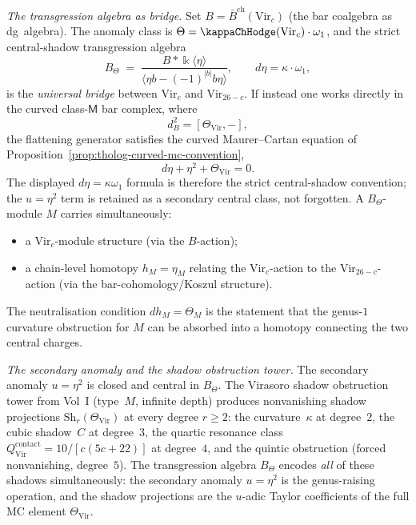 \begin{computation}
\emph{The transgression algebra as bridge.}
Set $B=\bar B^{\mathrm{ch}}(\mathrm{Vir}_c)$
(the bar coalgebra as dg~algebra). The anomaly class is
$\Theta=\kappaChHodge(\mathrm{Vir}_c)\cdot\omega_1$, and the
strict central-shadow transgression algebra
\[
B_\Theta
\;=\;
\frac{B*\Bbbk\langle\eta\rangle}
{\langle\eta b-(-1)^{|b|}b\eta\rangle},
\qquad
d\eta=\kappa\cdot\omega_1,
\]
is the \emph{universal bridge} between $\mathrm{Vir}_c$
and $\mathrm{Vir}_{26-c}$. If instead one works directly in the
curved class-$\mathsf M$ bar complex, where
\[
d_{B}^{2}=[\Theta_{\mathrm{Vir}},-],
\]
the flattening generator satisfies the curved Maurer--Cartan equation
of Proposition~\ref{prop:tholog-curved-mc-convention},
\[
d\eta+\eta^{2}+\Theta_{\mathrm{Vir}}=0.
\]
The displayed \(d\eta=\kappa\omega_1\) formula is therefore the
strict central-shadow convention; the \(u=\eta^{2}\) term is retained
as a secondary central class, not forgotten. A $B_\Theta$-module $M$
carries simultaneously:
\begin{itemize}
\item a $\mathrm{Vir}_c$-module structure (via the
 $B$-action);
\item a chain-level homotopy $h_M=\eta_M$ relating the
 $\mathrm{Vir}_c$-action to the $\mathrm{Vir}_{26-c}$-action
 (via the bar-cohomology/Koszul structure).
\end{itemize}
The neutralisation condition $dh_M=\Theta_M$ is the statement
that the genus-$1$ curvature obstruction for $M$ can be
absorbed into a homotopy connecting the two central charges.

\emph{The secondary anomaly and the shadow obstruction tower.}
The secondary anomaly $u=\eta^2$ is closed and central in
$B_\Theta$. The Virasoro shadow obstruction tower from Vol~I
(type~$M$, infinite depth) produces nonvanishing shadow
projections $\mathrm{Sh}_r(\Theta_{\mathrm{Vir}})$ at every
degree $r\ge 2$: the curvature~$\kappa$ at degree~$2$,
the cubic shadow~$C$ at degree~$3$, the quartic resonance
class $Q^{\mathrm{contact}}_{\mathrm{Vir}}
=10/[c(5c{+}22)]$ at degree~$4$, and the quintic obstruction
(forced nonvanishing, degree~$5$).
The transgression algebra $B_\Theta$ encodes
\emph{all} of these shadows simultaneously: the secondary
anomaly $u=\eta^2$ is the genus-raising operation, and the
shadow projections are the $u$-adic Taylor coefficients of
the full MC element $\Theta_{\mathrm{Vir}}$.


\end{computation}
